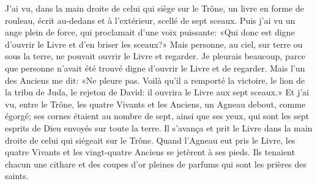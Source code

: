 J’ai vu, dans la main droite de celui qui siège sur le Trône,
	un livre en forme de rouleau, écrit au-dedans et à l’extérieur,
	scellé de sept sceaux.
Puis j’ai vu un ange plein de force, qui proclamait d’une voix puissante:
	«Qui donc est digne d’ouvrir le Livre et d’en briser les sceaux?»
Mais personne, au ciel, sur terre ou sous la terre,
	ne pouvait ouvrir le Livre et regarder.
Je pleurais beaucoup,
	parce que personne n’avait été trouvé digne
		d’ouvrir le Livre et de regarder.
Mais l’un des Anciens me dit: «Ne pleure pas.
Voilà qu’il a remporté la victoire,
	le lion de la tribu de Juda, le rejeton de David:
	il ouvrira le Livre aux sept sceaux.»
Et j’ai vu, entre le Trône, les quatre Vivants et les Anciens,
	un Agneau debout, comme égorgé;
	ses cornes étaient au nombre de sept, ainsi que ses yeux,
	qui sont les sept esprits de Dieu envoyés sur toute la terre.
Il s’avança
	et prit le Livre dans la main droite de celui qui siégeait sur le Trône.
Quand l’Agneau eut pris le Livre,
	les quatre Vivants et les vingt-quatre Anciens se jetèrent à ses pieds.
Ils tenaient chacun une cithare
	et des coupes d’or pleines de parfums qui sont les prières des saints.
